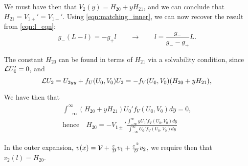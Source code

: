 We must have then that $V_2(y) = H_{20} + yH_{21}$, and we can conclude that $H_{21} = V_{1+}' = V_{1-}'$. Using \eqref{eqn:matching_inner}, we can now recover the result from \eqref{eqn:l_eqn}:
% 
\begin{equation*}
	g_-(L-l) = -g_+l\qquad \rightarrow \qquad l=\frac{g_-}{g_- - g_+}L.
\end{equation*}
% 

The constant $H_{20}$ can be found in terms of $H_{21}$ via a solvability condition, since $\mathcal{L} U_0' = 0$, and 
% 
\begin{equation*}
	\mathcal{L} U_2 = U_{2yy} + f_U(U_0,V_0)U_2 = -f_V(U_0,V_0)(H_{20}+yH_{21}),\\
\end{equation*}
% 

We have then that
% 
\begin{equation*}
\begin{split}
\begin{aligned}
  \int_{-\infty}^{\infty}(H_{20}+yH_{21})U_0'f_V(U_0,V_0)dy = 0,\\
	\text{hence}\quad H_{20} = -V_{1\pm}'\frac{\int_{-\infty}^{\infty}yU_0'f_V(U_0,V_0)dy}{\int_{-\infty}^{\infty}U_0'f_V(U_0,V_0)dy}
\end{aligned}
\end{split}
\end{equation*}
% 

In the outer expansion, $v(x) = \mathcal{V} + \frac{\varepsilon\,}{\mathcal{D}}v_1 + \frac{\varepsilon\,^2}{\mathcal{D}}v_2$, we require then that $v_2(l) = H_{20}$.
